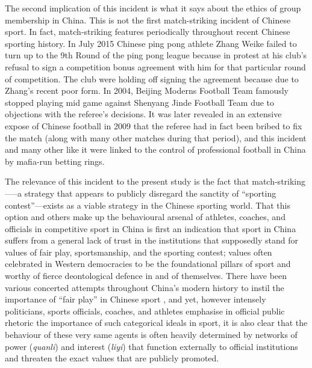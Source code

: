 The second implication of this incident is what it says about the ethics of group membership in China.  This is not the first match-striking incident of Chinese sport. In fact, match-striking features periodically throughout recent Chinese sporting history.  In July 2015 Chinese ping pong athlete Zhang Weike failed to turn up to the 9th Round of the ping pong league because in protest at his club's refusal to sign a competition bonus agreement with him for that particular round of competition. The club were holding off signing the agreement because due to Zhang's recent poor form.  In 2004, Beijing Moderns Football Team famously stopped playing mid game against Shenyang Jinde Football Team due to objections with the referee's decisions. It was later revealed in an extensive expose of Chinese football in 2009 that the referee had in fact been bribed to fix the match (along with many other matches during that period), and this incident and many other like it were linked to the control of professional football in China by mafia-run betting rings.

The relevance of this incident to the present study is the fact that match-striking—--a strategy that appears to publicly disregard the sanctity of ``sporting contest''---exists as a viable strategy in the Chinese sporting world. That this option and others make up the behavioural arsenal of athletes, coaches, and officials in competitive sport in China is first an indication that sport in China suffers from a general lack of trust in the institutions that supposedly stand for values of fair play, sportsmanship, and the sporting contest; values often celebrated in Western democracies to be the foundational pillars of sport and worthy of fierce deontological defence in and of themselves\citep{Morris2004,Gold2002,Yuki2005}.
There have been various concerted attempts throughout China's modern history to instil the importance of ``fair play'' in Chinese sport \citep{Morris2004,Brownell1995,Brownell2008}, and yet, however intensely politicians, sports officials, coaches, and athletes emphasise in official public rhetoric the importance of such categorical ideals in sport, it is also clear that the behaviour of these very same agents is often heavily determined by networks of power (\textit{quanli}) and interest (\textit{liyi}) that function externally to official institutions and threaten the exact values that are publicly promoted.

